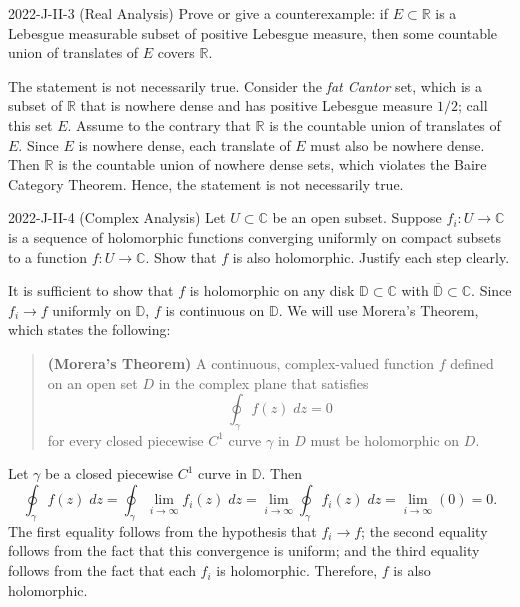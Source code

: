 \documentclass{article}
\begin{document}
\begin{prb}{2022-J-II-3 (Real Analysis)}
	Prove or give a counterexample: if $E \subset \mathbb{R}$ is a Lebesgue measurable subset of positive Lebesgue measure, then some countable union of translates of $E$ covers $\mathbb{R}$.
\end{prb}
\begin{solutions}
	The statement is not necessarily true. Consider the \textit{fat Cantor} set, which is a subset of $\mathbb{R}$ that is nowhere dense and has positive Lebesgue measure $1/2$; call this set $E$. Assume to the contrary that $\mathbb{R}$ is the countable union of translates of $E$. Since $E$ is nowhere dense, each translate of $E$ must also be nowhere dense. Then $\mathbb{R}$ is the countable union of nowhere dense sets, which violates the Baire Category Theorem. Hence, the statement is not necessarily true. 
\end{solutions}
\begin{prb}{2022-J-II-4 (Complex Analysis)}
	Let $U \subset \mathbb{C}$ be an open subset. Suppose $f_{i}: U \to \mathbb{C}$ is a sequence of holomorphic functions converging uniformly on compact subsets to a function $f: U \to \mathbb{C}$. Show that $f$ is also holomorphic. Justify each step clearly. 
\end{prb}
\begin{solutions}
	It is sufficient to show that $f$ is holomorphic on any disk $\mathbb{D}\subset \mathbb{C}$ with $\overline{\mathbb{D}} \subset \mathbb{C}$. Since $f_{i} \to f$ uniformly on $\mathbb{D}$, $f$ is continuous on $\mathbb{D}$. We will use Morera's Theorem, which states the following: 
		\begin{quote}
			\textbf{(Morera's Theorem)} A continuous, complex-valued function $f$ defined on an open set $D$ in the complex plane that satisfies 
				\begin{equation*}
					\oint_{\gamma}f(z)\;dz = 0
				\end{equation*}
			for every closed piecewise $C^{1}$ curve $\gamma$ in $D$ must be holomorphic on $D$. 
		\end{quote}
	Let $\gamma$ be a closed piecewise $C^{1}$ curve in $\mathbb{D}$. Then 
		\begin{equation}
			\oint_{\gamma}f(z)\;dz = \oint_{\gamma}\lim_{i \to \infty}f_{i}(z)\;dz = \lim_{i \to \infty}\oint_{\gamma}f_{i}(z)\;dz  = \lim_{i \to \infty}(0) = 0. 
		\end{equation}
	The first equality follows from the hypothesis that $f_{i} \to f$; the second equality follows from the fact that this convergence is uniform; and the third equality follows from the fact that each $f_{i}$ is holomorphic. Therefore, $f$ is also holomorphic. 	
\end{solutions}
\end{document}
